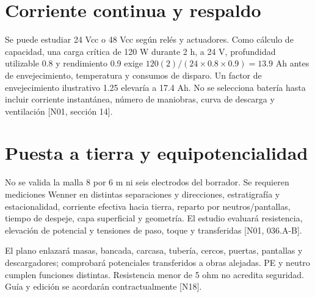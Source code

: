 \section{Corriente continua y respaldo}
Se puede estudiar 24 Vcc o 48 Vcc según relés y actuadores. Como cálculo de capacidad, una carga crítica de 120 W durante 2 h, a 24 V, profundidad utilizable 0.8 y rendimiento 0.9 exige $120(2)/(24\times0.8\times0.9)=13.9$ Ah antes de envejecimiento, temperatura y consumos de disparo. Un factor de envejecimiento ilustrativo 1.25 elevaría a 17.4 Ah. No se selecciona batería hasta incluir corriente instantánea, número de maniobras, curva de descarga y ventilación [N01, sección 14].

\section{Puesta a tierra y equipotencialidad}
No se valida la malla 8 por 6 m ni seis electrodos del borrador. Se requieren mediciones Wenner en distintas separaciones y direcciones, estratigrafía y estacionalidad, corriente efectiva hacia tierra, reparto por neutros/pantallas, tiempo de despeje, capa superficial y geometría. El estudio evaluará resistencia, elevación de potencial y tensiones de paso, toque y transferidas [N01, 036.A-B].

El plano enlazará masas, bancada, carcasa, tubería, cercos, puertas, pantallas y descargadores; comprobará potenciales transferidos a obras alejadas. PE y neutro cumplen funciones distintas. Resistencia menor de 5 ohm no acredita seguridad. Guía y edición se acordarán contractualmente [N18].
